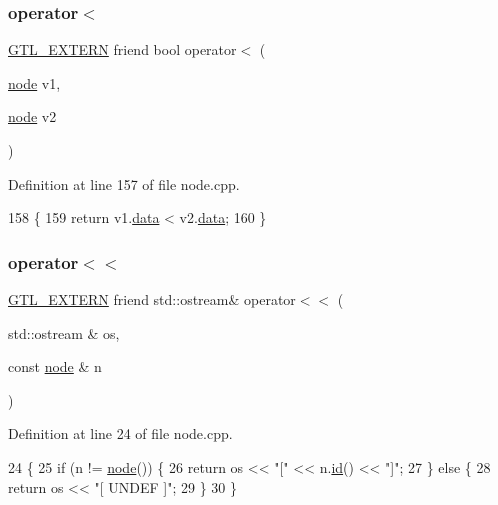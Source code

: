 \subsubsection{\texorpdfstring{operator$<$}{operator<}}
{\footnotesize\ttfamily \mbox{\hyperlink{_g_t_l_8h_a014cd1e9b3e67a78ae433eda95c8fd25}{G\+T\+L\+\_\+\+E\+X\+T\+E\+RN}} friend bool operator$<$ (\begin{DoxyParamCaption}\item[{\mbox{\hyperlink{classnode}{node}}}]{v1,  }\item[{\mbox{\hyperlink{classnode}{node}}}]{v2 }\end{DoxyParamCaption})\hspace{0.3cm}{\ttfamily [friend]}}



Definition at line 157 of file node.\+cpp.


\begin{DoxyCode}
158 \{
159     \textcolor{keywordflow}{return} v1.\mbox{\hyperlink{classnode_a4ae3d54ebb61be3a102bedf5b91bef75}{data}} < v2.\mbox{\hyperlink{classnode_a4ae3d54ebb61be3a102bedf5b91bef75}{data}};
160 \}
\end{DoxyCode}
\mbox{\label{classnode_a1da0a071bacaedcea8b018d6648a7505}} 
\subsubsection{\texorpdfstring{operator$<$$<$}{operator<<}}
{\footnotesize\ttfamily \mbox{\hyperlink{_g_t_l_8h_a014cd1e9b3e67a78ae433eda95c8fd25}{G\+T\+L\+\_\+\+E\+X\+T\+E\+RN}} friend std\+::ostream\& operator$<$$<$ (\begin{DoxyParamCaption}\item[{std\+::ostream \&}]{os,  }\item[{const \mbox{\hyperlink{classnode}{node}} \&}]{n }\end{DoxyParamCaption})\hspace{0.3cm}{\ttfamily [friend]}}



Definition at line 24 of file node.\+cpp.


\begin{DoxyCode}
24                                                                   \{
25     \textcolor{keywordflow}{if} (n != \mbox{\hyperlink{classnode_a6da4ea35f222059db9a59cf40be459f9}{node}}()) \{
26     \textcolor{keywordflow}{return} os << \textcolor{stringliteral}{"["} << n.\mbox{\hyperlink{classnode_a5d38b4152c3cedb235e45de7eb3f4469}{id}}() << \textcolor{stringliteral}{"]"};
27     \} \textcolor{keywordflow}{else} \{
28     \textcolor{keywordflow}{return} os << \textcolor{stringliteral}{"[ UNDEF ]"};
29     \}
30 \}
\end{DoxyCode}
\mbox{\label{classnode_a80fc8f2b4af1f3a8a9edb36ab2e89747}} 
